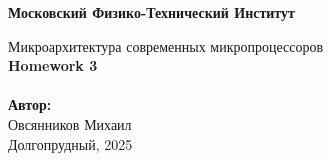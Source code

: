 \newcommand{\HRule}{\rule{\linewidth}{0.7mm}}

\begin{center}
	\large\textbf{Московский Физико-Технический Институт}\\
	\vfill
		
	\Large Микроархитектура современных микропроцессоров
	\\[0.4cm]
	{ \huge \bfseries Homework 3}
	\\[0.4cm]
	
	\ \\
	\textbf{\large Автор:} \\	
	\large Овсянников Михаил\\
	\vfill
	\large Долгопрудный, 2025
\end{center}

\thispagestyle{empty}

\newpage
\setcounter{page}{2}
